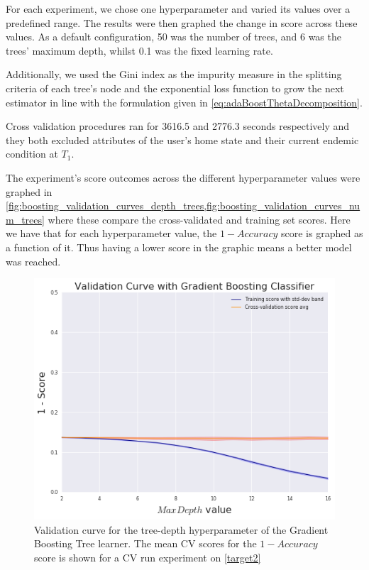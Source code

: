 For each experiment, we chose one hyperparameter and varied its values over a predefined range.
The results were then graphed the change in score across these values.
As a default configuration, 50 was the number of trees, and 6 was the trees' maximum depth, whilst 0.1 was the fixed learning rate.

Additionally, we used the Gini index as the impurity measure in the splitting criteria of each tree's node and the exponential loss function to grow the next estimator in line with the formulation given in \cref{eq:adaBoostThetaDecomposition}.

Cross validation procedures ran for 3616.5 and 2776.3 seconds respectively and they both excluded attributes of the user's home state and their current endemic condition at $T_1$.

The experiment's score outcomes across the different hyperparameter values were graphed in \cref{fig:boosting_validation_curves_depth_trees,fig:boosting_validation_curves_num_trees} where these compare the cross-validated and training set scores.
Here we have that for each hyperparameter value, the $1 - Accuracy$ score is graphed as a function of it.
Thus having a lower score in the graphic means a better model was reached.

\begin{figure}[h!]
    \begin{center}
        \includegraphics[width=1\linewidth]{figures/gradient-boosting/validation_curve_boosting_depth_series_f1}
        \caption{ Validation curve for the tree-depth hyperparameter of the Gradient Boosting Tree learner.
        The mean CV scores for the $1 - Accuracy$ score is shown for a CV run experiment on \cref{target2}}
        \label{fig:boosting_validation_curves_depth_trees}

    \end{center}
\end{figure}

